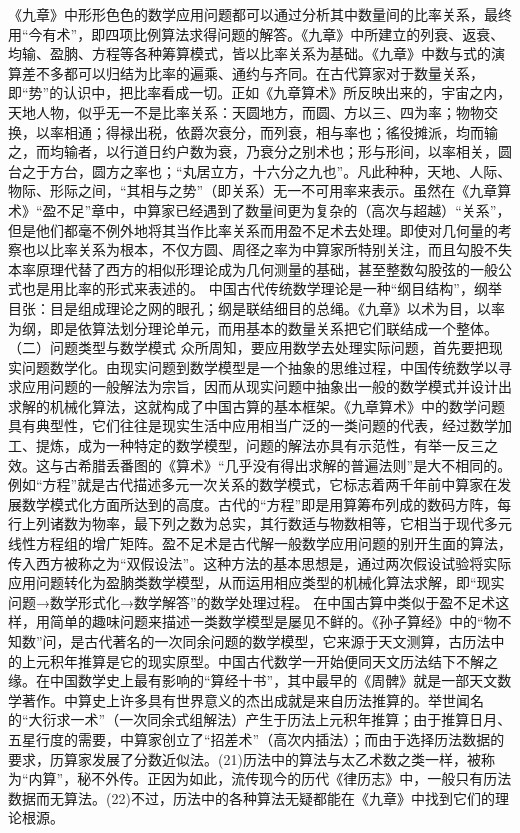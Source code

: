 \documentclass[a4paper,12pt,UTF8,twoside]{ctexbook}
\begin{document}
《九章》中形形色色的数学应用问题都可以通过分析其中数量间的比率关系，最终用“今有术”，即四项比例算法求得问题的解答。《九章》中所建立的列衰、返衰、均输、盈朒、方程等各种筹算模式，皆以比率关系为基础。《九章》中数与式的演算差不多都可以归结为比率的遍乘、通约与齐同。在古代算家对于数量关系，即“势”的认识中，把比率看成一切。正如《九章算术》所反映出来的，宇宙之内，天地人物，似乎无一不是比率关系：天圆地方，而圆、方以三、四为率；物物交换，以率相通；得禄出税，依爵次衰分，而列衰，相与率也；徭役摊派，均而输之，而均输者，以行道日约户数为衰，乃衰分之别术也；形与形间，以率相关，圆台之于方台，圆方之率也；“丸居立方，十六分之九也”。凡此种种，天地、人际、物际、形际之间，“其相与之势”（即关系）无一不可用率来表示。虽然在《九章算术》“盈不足”章中，中算家已经遇到了数量间更为复杂的（高次与超越）“关系”，但是他们都毫不例外地将其当作比率关系而用盈不足术去处理。即使对几何量的考察也以比率关系为根本，不仅方圆、周径之率为中算家所特别关注，而且勾股不失本率原理代替了西方的相似形理论成为几何测量的基础，甚至整数勾股弦的一般公式也是用比率的形式来表述的。
中国古代传统数学理论是一种“纲目结构”，纲举目张：目是组成理论之网的眼孔；纲是联结细目的总绳。《九章》以术为目，以率为纲，即是依算法划分理论单元，而用基本的数量关系把它们联结成一个整体。
（二）问题类型与数学模式
众所周知，要应用数学去处理实际问题，首先要把现实问题数学化。由现实问题到数学模型是一个抽象的思维过程，中国传统数学以寻求应用问题的一般解法为宗旨，因而从现实问题中抽象出一般的数学模式并设计出求解的机械化算法，这就构成了中国古算的基本框架。《九章算术》中的数学问题具有典型性，它们往往是现实生活中应用相当广泛的一类问题的代表，经过数学加工、提炼，成为一种特定的数学模型，问题的解法亦具有示范性，有举一反三之效。这与古希腊丢番图的《算术》“几乎没有得出求解的普遍法则”是大不相同的。
例如“方程”就是古代描述多元一次关系的数学模式，它标志着两千年前中算家在发展数学模式化方面所达到的高度。古代的“方程”即是用算筹布列成的数码方阵，每行上列诸数为物率，最下列之数为总实，其行数适与物数相等，它相当于现代多元线性方程组的增广矩阵。盈不足术是古代解一般数学应用问题的别开生面的算法，传入西方被称之为“双假设法”。这种方法的基本思想是，通过两次假设试验将实际应用问题转化为盈朒类数学模型，从而运用相应类型的机械化算法求解，即“现实问题→数学形式化→数学解答”的数学处理过程。
在中国古算中类似于盈不足术这样，用简单的趣味问题来描述一类数学模型是屡见不鲜的。《孙子算经》中的“物不知数”问，是古代著名的一次同余问题的数学模型，它来源于天文测算，古历法中的上元积年推算是它的现实原型。中国古代数学一开始便同天文历法结下不解之缘。在中国数学史上最有影响的“算经十书”，其中最早的《周髀》就是一部天文数学著作。中算史上许多具有世界意义的杰出成就是来自历法推算的。举世闻名的“大衍求一术”（一次同余式组解法）产生于历法上元积年推算；由于推算日月、五星行度的需要，中算家创立了“招差术”（高次内插法）；而由于选择历法数据的要求，历算家发展了分数近似法。(21)历法中的算法与太乙术数之类一样，被称为“内算”，秘不外传。正因为如此，流传现今的历代《律历志》中，一般只有历法数据而无算法。(22)不过，历法中的各种算法无疑都能在《九章》中找到它们的理论根源。
\end{document}
